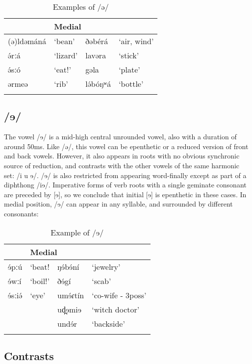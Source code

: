 \begin{table} 
\caption{Examples of /ə/}	
 \label{tab:ch2:9}
\begin{tabular}[t]{lp{3.5cm}lp{3.5cm}}
\lsptoprule
\multicolumn{2}{l}{Initial} &	\multicolumn{2}{l}{Medial}  \\
\midrule
(ə)ldəmáná	&	‘bean’	&	ðəbérá		&	‘air, wind’\\
ə́rːá		&	‘lizard’	&	lavəra		&	‘stick’\\
ə́sːó		&	‘eat!’	&	gəla			&	‘plate’\\
ərmeə		&	‘rib’		&	lə́bóŋʷá	&	‘bottle’\\
\lspbottomrule	
\end{tabular}
\end{table}

\subsection{/ɘ/}

The vowel /ɘ/ is a mid-high central unrounded vowel, also with a duration of around 50ms. Like /ə/, this vowel can be epenthetic or a reduced version of front and back vowels. However, it also appears in roots with no obvious synchronic source of reduction, and contrasts with the other vowels of the same harmonic set: /i u ɘ/. /ɘ/ is also restricted from appearing word-finally except as part of a diphthong /iɘ/. Imperative forms of verb roots with a single geminate consonant are preceded by [ɘ], so we conclude that initial [ɘ] is epenthetic in these cases. In medial position, /ɘ/ can appear in any syllable, and surrounded by different consonants:

\begin{table} 
\caption{Example of /ɘ/}	
 \label{tab:ch2:10}
\begin{tabular}[t]{lp{3.5cm}lp{3.5cm}}
\lsptoprule
\multicolumn{2}{l}{Initial} &	\multicolumn{2}{l}{Medial}  \\
\midrule
ɘ́pːú	&‘beat!	&ŋɘ́bɘ́ní	&	‘jewelry’\\
ɘ́wːí	&‘boil!’	&ðɘ́gí		&	‘scab’\\
ɘ́sːiə́	&‘eye’	&umɘ́ɾtín	&	‘co-wife - 3poss’\\
		&&ud̪ɘmiɘ			&	‘witch doctor’\\
		&&undɘ́r				&	‘backside’\\
\lspbottomrule	
\end{tabular}
\end{table}

\subsection{Contrasts}

